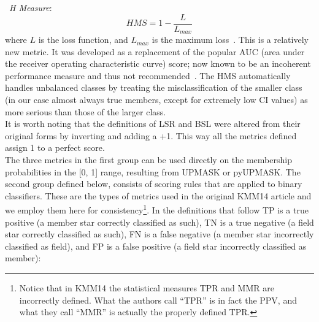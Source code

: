 \documentclass[draft]{aa}
\begin{document}
 \noindent \textbullet\ \emph{H Measure}:
 \begin{equation}
 HMS = 1 - \frac{L}{L_{max}}
 \end{equation}
 \noindent where $L$ is the loss function, and $L_{max}$ is the maximum
 loss~\cite[the expression for the loss function is much too mathematically
 involved to be presented here, it can be seen in full in][]{Hand_2009}.
 This is a relatively new metric. It was developed as a replacement of the
 popular AUC (area under the receiver operating characteristic curve) score;
 now known to be an incoherent performance measure and thus not
 recommended~\citep{Lobo_2008,Parker_2011,Hand_2014}. The HMS automatically
 handles unbalanced classes by treating the misclassification of the smaller
 class (in our case almost always true members, except for extremely low CI
 values) as more serious than those of the larger class.\\

 \noindent It is worth noting that the definitions of LSR and BSL were altered
 from their original forms by inverting and adding a +1. This way all the
 metrics defined assign 1 to a perfect score.\\

 The three metrics in the first group can be used directly on the membership
 probabilities in the [0, 1] range, resulting from UPMASK or pyUPMASK.
 The second group defined below, consists of scoring rules that are applied
 to binary classifiers. These are the types of metrics used in the original
 KMM14 article and we employ them here for consistency\footnote{Notice that in
 KMM14 the statistical measures TPR and MMR are incorrectly defined. What the
 authors call ``TPR'' is in fact the PPV, and what they call ``MMR''
 is actually the properly defined TPR.}.
 In the definitions that follow TP is a true positive (a member star correctly
 classified as such), TN is a true negative (a field star correctly classified
 as such), FN is a false negative (a member star incorrectly
 classified as field), and FP is a false positive (a field star incorrectly
 classified as member):\\
\end{document}
